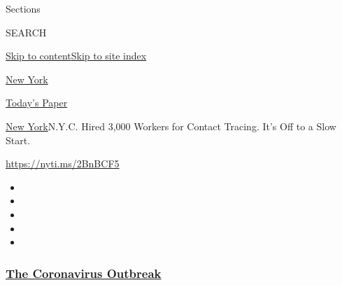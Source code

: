 Sections

SEARCH

\protect\hyperlink{site-content}{Skip to
content}\protect\hyperlink{site-index}{Skip to site index}

\href{https://www.nytimes3xbfgragh.onion/section/nyregion}{New York}

\href{https://myaccount.nytimes3xbfgragh.onion/auth/login?response_type=cookie\&client_id=vi}{}

\href{https://www.nytimes3xbfgragh.onion/section/todayspaper}{Today's
Paper}

\href{/section/nyregion}{New York}\textbar{}N.Y.C. Hired 3,000 Workers
for Contact Tracing. It's Off to a Slow Start.

\url{https://nyti.ms/2BnBCF5}

\begin{itemize}
\item
\item
\item
\item
\item
\end{itemize}

\hypertarget{the-coronavirus-outbreak}{%
\subsubsection{\texorpdfstring{\href{https://www.nytimes3xbfgragh.onion/news-event/coronavirus?name=styln-coronavirus-national\&region=TOP_BANNER\&variant=undefined\&block=storyline_menu_recirc\&action=click\&pgtype=Article\&impression_id=dc93d4a0-e386-11ea-80a3-6f317e203e1c}{The
Coronavirus
Outbreak}}{The Coronavirus Outbreak}}\label{the-coronavirus-outbreak}}

